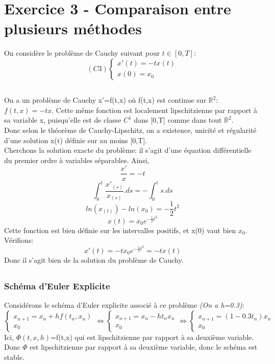 \documentclass[a4paper,12pt,landscape]{article}
\begin{document}
\section{Exercice 3 - Comparaison entre plusieurs méthodes}
On considère le problème de Cauchy suivant pour $t\in [0,T]$:
$$
(C3) \left \{
\begin{array}{l}
	x'(t)= -tx(t) \\
	x(0) = x_0
\end{array}
\right.
$$
\subsection{}
On a un problème de Cauchy x'=f(t,x) où f(t,x) est continue sur $\mathbb{R}^2$: $f(t,x)=-tx$. Cette même fonction est localement lipschitzienne par rapport à sa variable x, puisqu'elle est de classe $C^1$ dans [0,T] comme dans tout $\mathbb{R}^2$.\\
Donc selon le théorème de Cauchy-Lipschitz, on a existence, unicité et régularité d'une solution x(t) définie sur au moins [0,T].\\

Cherchons la solution exacte du problème: il s'agit d'une équation différentielle du premier ordre à variables séparables. Ainsi,
$$\frac{x'}{x}=-t$$
$$\int_0^t\frac{x'_{(s)}}{x_{(s)}}.ds = - \int_0^t s.ds$$
$$ln(x_{(t)})-ln(x_0)=-\frac{1}{2}t^2$$
$$x(t)=x_0 e^{-\frac{1}{2}t^2}$$
Cette fonction est bien définie sur les intervalles positifs, et x(0) vaut bien $x_0$.
Vérifions:
$$x'(t)=-t x_0 e^{-\frac{1}{2}t^2}=-tx(t)$$
Donc il s'agit bien de la solution du problème de Cauchy.

\subsection{}
\subsubsection{Schéma d'Euler Explicite}
Considérons le schéma d'Euler explicite associé à ce problème {\it (On a h=0.3)}:
$$\left \{
\begin{array}{l}
	x_{n+1}= x_n + h f(t_n,x_n)\\
	x_0 
\end{array}
\right.
\Leftrightarrow
\left \{
\begin{array}{l}
	x_{n+1}= x_n -ht_nx_n\\
	x_0
\end{array}
\right.
\Leftrightarrow
\left \{
\begin{array}{l}
	x_{n+1}= (1-0.3t_n)x_n\\
	x_0
\end{array}
\right.$$
Ici, $\Phi(t,x,h)$=f(t,x) qui est lipschitzienne par rapport à sa deuxième variable. Donc $\Phi$ est lipschitzienne par rapport à sa deuxième variable, donc le schéma est stable.\\
\end{document}
